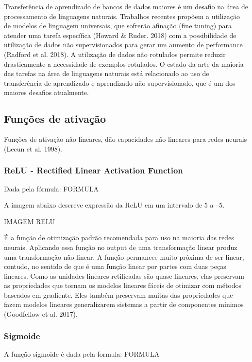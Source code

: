 \documentclass[12pt]{article}
\begin{document}
Transferência de aprendizado de bancos de dados maiores é um desafio na área de processamento de linguagens naturais. Trabalhos recentes propõem a utilização de modelos de linguagem universais, que sofrerão afinação (fine tuning) para atender uma tarefa específica (Howard & Ruder.  2018) com a possibilidade de utilização de dados não supervisionados para gerar um aumento de performance (Radford et al. 2018). A utilização de dados não rotulados permite reduzir drasticamente a necessidade de exemplos rotulados. O estado da arte da maioria das tarefas na área de linguagens naturais está relacionado ao uso de transferência de aprendizado e aprendizado não supervisionado, que é um dos maiores desafios atualmente.

\subsection{Funções de ativação}

Funções de ativação não lineares, dão capacidades não lineares para redes neurais (Lecun et al. 1998).

\subsubsection{ReLU - Rectified Linear Activation Function}

Dada pela fórmula: FORMULA

A imagem abaixo descreve expressão da ReLU em um intervalo de 5 a –5.

IMAGEM RELU

É a função de otimização padrão recomendada para uso na maioria das redes neurais. Aplicando essa função no output de uma transformação linear produz uma transformação não linear. A função permanece muito próxima de ser linear, contudo, no sentido de que é uma função linear por partes com duas peças lineares. Como as unidades lineares retificadas são quase lineares, elas preservam as propriedades que tornam os modelos lineares fáceis de otimizar com métodos baseados em gradiente. Eles também preservam muitas das propriedades que fazem modelos lineares generalizarem sistemas a partir de componentes mínimos (Goodfellow et al. 2017).

\subsubsection{Sigmoide}

A função sigmoide é dada pela formula: FORMULA
\end{document}
